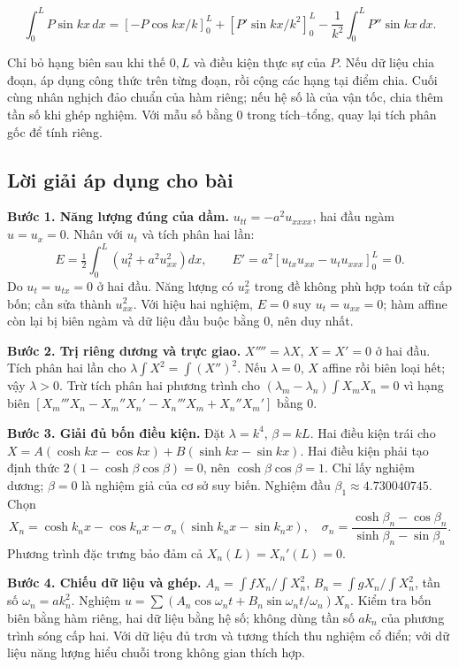 \documentclass[10pt,a4paper]{article}
\begin{document}
\[
\int_0^L P\sin kx\,dx
=\left[-P\cos kx/k\right]_0^L+
\left[P'\sin kx/k^2\right]_0^L-
\frac1{k^2}\int_0^L P''\sin kx\,dx.
\]


Chỉ bỏ hạng biên sau khi thế $0,L$ và điều kiện thực sự của $P$. Nếu dữ liệu chia đoạn, áp dụng công thức trên từng đoạn, rồi cộng các hạng tại điểm chia. Cuối cùng nhân nghịch đảo chuẩn của hàm riêng; nếu hệ số là của vận tốc, chia thêm tần số khi ghép nghiệm. Với mẫu số bằng $0$ trong tích–tổng, quay lại tích phân gốc để tính riêng.
\subsection*{Lời giải áp dụng cho bài}
\textbf{Bước 1. Năng lượng đúng của dầm.} $u_{tt}=-a^2u_{xxxx}$, hai đầu ngàm $u=u_x=0$. Nhân với $u_t$ và tích phân hai lần:
\[E=\tfrac12\int_0^L(u_t^2+a^2u_{xx}^2)dx,\qquad E'=a^2[u_{tx}u_{xx}-u_tu_{xxx}]_0^L=0.\]
Do $u_t=u_{tx}=0$ ở hai đầu. Năng lượng có $u_x^2$ trong đề không phù hợp toán tử cấp bốn; cần sửa thành $u_{xx}^2$. Với hiệu hai nghiệm, $E=0$ suy $u_t=u_{xx}=0$; hàm affine còn lại bị biên ngàm và dữ liệu đầu buộc bằng $0$, nên duy nhất.

\textbf{Bước 2. Trị riêng dương và trực giao.} $X''''=\lambda X$, $X=X'=0$ ở hai đầu. Tích phân hai lần cho $\lambda\int X^2=\int(X'')^2$. Nếu $\lambda=0$, $X$ affine rồi biên loại hết; vậy $\lambda>0$. Trừ tích phân hai phương trình cho $(\lambda_m-\lambda_n)\int X_mX_n=0$ vì hạng biên $[X_m'''X_n-X_m''X_n'-X_n'''X_m+X_n''X_m']$ bằng $0$.

\textbf{Bước 3. Giải đủ bốn điều kiện.} Đặt $\lambda=k^4$, $\beta=kL$. Hai điều kiện trái cho $X=A(\cosh kx-\cos kx)+B(\sinh kx-\sin kx)$. Hai điều kiện phải tạo định thức $2(1-\cosh\beta\cos\beta)=0$, nên $\cosh\beta\cos\beta=1$. Chỉ lấy nghiệm dương; $\beta=0$ là nghiệm giả của cơ sở suy biến. Nghiệm đầu $\beta_1\approx4.730040745$. Chọn
\[X_n=\cosh k_nx-\cos k_nx-\sigma_n(\sinh k_nx-\sin k_nx),\quad
\sigma_n=\frac{\cosh\beta_n-\cos\beta_n}{\sinh\beta_n-\sin\beta_n}.\]
Phương trình đặc trưng bảo đảm cả $X_n(L)=X_n'(L)=0$.

\textbf{Bước 4. Chiếu dữ liệu và ghép.} $A_n=\int fX_n/\int X_n^2$, $B_n=\int gX_n/\int X_n^2$, tần số $\omega_n=ak_n^2$. Nghiệm $u=\sum(A_n\cos\omega_nt+B_n\sin\omega_nt/\omega_n)X_n$. Kiểm tra bốn biên bằng hàm riêng, hai dữ liệu bằng hệ số; không dùng tần số $ak_n$ của phương trình sóng cấp hai. Với dữ liệu đủ trơn và tương thích thu nghiệm cổ điển; với dữ liệu năng lượng hiểu chuỗi trong không gian thích hợp.
\end{document}
